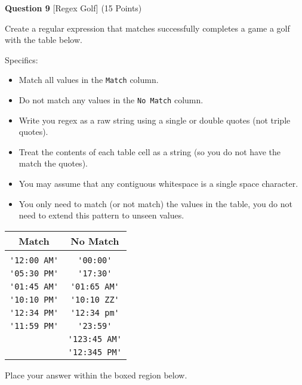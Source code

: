 \documentclass{article}
\begin{document}

\vspace{1.0cm}


\begin{minipage}{\textwidth}
    \noindent
    \textbf{Question 9} [Regex Golf] (15 Points)
    \vspace{0.25cm}

    \noindent
    Create a regular expression that matches successfully completes a game a golf with the table below.

Specifics:
\begin{itemize}
    \item Match all values in the \verb|Match| column.
    \item Do not match any values in the \verb|No Match| column.
    \item Write you regex as a raw string using a single or double quotes (not triple quotes).
    \item Treat the contents of each table cell as a string (so you do not have the match the quotes).
    \item You may assume that any contiguous whitespace is a single space character.
    \item You only need to match (or not match) the values in the table, you do not need to extend this pattern to unseen values.
\end{itemize}


\begin{center}
    \begin{tabular}{ cc }
        Match & No Match \\
        \hline \\
        \verb|'12:00 AM'| & \verb|'00:00'| \\
        \verb|'05:30 PM'| & \verb|'17:30'| \\
        \verb|'01:45 AM'| & \verb|'01:65 AM'| \\
        \verb|'10:10 PM'| & \verb|'10:10 ZZ'| \\
        \verb|'12:34 PM'| & \verb|'12:34 pm'| \\
        \verb|'11:59 PM'| & \verb|'23:59'| \\
         & \verb|'123:45 AM'| \\
         & \verb|'12:345 PM'| \\
    \end{tabular}
\end{center}


    \vspace{0.25cm}
    Place your answer within the boxed region below.
    \vspace{0.25cm}

\end{minipage}
\end{document}
